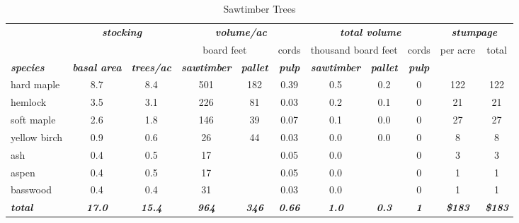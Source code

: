 \documentclass[landscape]{article}
\begin{document}
\begin{table}[H]

\caption{\label{tab:unnamed-chunk-47}Sawtimber Trees}
\fontsize{10}{12}\selectfont
\begin{tabular}[t]{lcccccccccc}
\toprule
\multicolumn{1}{c}{\em{\textbf{ }}} & \multicolumn{2}{c}{\em{\textbf{stocking}}} & \multicolumn{3}{c}{\em{\textbf{volume/ac }}} & \multicolumn{3}{c}{\em{\textbf{total volume}}} & \multicolumn{2}{c}{\em{\textbf{stumpage}}} \\
\cmidrule(l{3pt}r{3pt}){2-3} \cmidrule(l{3pt}r{3pt}){4-6} \cmidrule(l{3pt}r{3pt}){7-9} \cmidrule(l{3pt}r{3pt}){10-11}
\multicolumn{3}{c}{ } & \multicolumn{2}{c}{board feet} & \multicolumn{1}{c}{cords} & \multicolumn{2}{c}{thousand board feet} & \multicolumn{1}{c}{cords} & \multicolumn{1}{c}{per acre} & \multicolumn{1}{c}{total} \\
\cmidrule(l{3pt}r{3pt}){4-5} \cmidrule(l{3pt}r{3pt}){6-6} \cmidrule(l{3pt}r{3pt}){7-8} \cmidrule(l{3pt}r{3pt}){9-9} \cmidrule(l{3pt}r{3pt}){10-10} \cmidrule(l{3pt}r{3pt}){11-11}
\rowcolor[HTML]{DCDCDC}  \em{\textbf{species}} & \em{\textbf{basal area}} & \em{\textbf{trees/ac}} & \em{\textbf{sawtimber}} & \em{\textbf{pallet}} & \em{\textbf{pulp}} & \em{\textbf{sawtimber}} & \em{\textbf{pallet}} & \em{\textbf{pulp}} & \em{\textbf{ }} & \em{\textbf{ }}\\
\midrule
\rowcolor{gray!6}  hard maple & 8.7 & 8.4 & 501 & 182 & 0.39 & 0.5 & 0.2 & 0 & 122 & 122\\
 
hemlock & 3.5 & 3.1 & 226 & 81 & 0.03 & 0.2 & 0.1 & 0 & 21 & 21\\
 
\rowcolor{gray!6}  soft maple & 2.6 & 1.8 & 146 & 39 & 0.07 & 0.1 & 0.0 & 0 & 27 & 27\\
 
yellow birch & 0.9 & 0.6 & 26 & 44 & 0.03 & 0.0 & 0.0 & 0 & 8 & 8\\
 
\rowcolor{gray!6}  ash & 0.4 & 0.5 & 17 &  & 0.05 & 0.0 &  & 0 & 3 & 3\\
 
aspen & 0.4 & 0.5 & 17 &  & 0.05 & 0.0 &  & 0 & 1 & 1\\
 
\rowcolor{gray!6}  basswood & 0.4 & 0.4 & 31 &  & 0.03 & 0.0 &  & 0 & 1 & 1\\
 
\rowcolor[HTML]{DCDCDC}  \em{\textbf{total}} & \em{\textbf{17.0}} & \em{\textbf{15.4}} & \em{\textbf{964}} & \em{\textbf{346}} & \em{\textbf{0.66}} & \em{\textbf{1.0}} & \em{\textbf{0.3}} & \em{\textbf{1}} & \em{\textbf{\$183}} & \em{\textbf{\$183}}\\
\bottomrule
\end{tabular}
\end{table}
\end{document}
